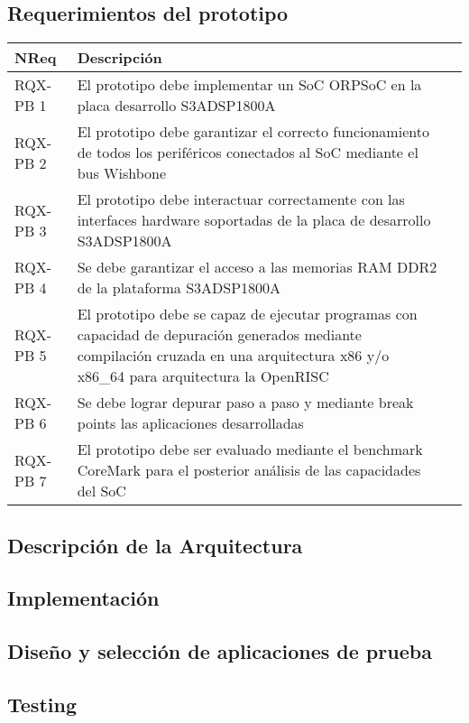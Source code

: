 		\subsection{Requerimientos del prototipo}
		\begin{tabular}{ p{2.5cm} p{8cm} p{3cm} }
		\hline 
		\rowcolor[gray]{0.8} N\textordmasculine Req & Descripción\\
		\hline 
		RQX-PB 1 & El prototipo debe implementar un SoC ORPSoC en la placa desarrollo S3ADSP1800A\\ 
		\hline 
		RQX-PB 2 & El prototipo debe garantizar el correcto funcionamiento de todos los periféricos conectados al SoC mediante el bus Wishbone\\ 
		\hline 
		RQX-PB 3 & El prototipo debe interactuar correctamente con las interfaces hardware soportadas de la placa de desarrollo S3ADSP1800A\\ 
		\hline
		RQX-PB 4 & Se debe garantizar el acceso a las memorias RAM DDR2 de la plataforma S3ADSP1800A\\
		\hline
		RQX-PB 5 & El prototipo debe se capaz de ejecutar programas con capacidad de depuración generados mediante compilación
		cruzada en una arquitectura x86 y/o x86\_64 para arquitectura la OpenRISC\\
		\hline
		RQX-PB 6 & Se debe lograr depurar paso a paso y mediante break points las aplicaciones desarrolladas\\
		\hline
		RQX-PB 7 & El prototipo debe ser evaluado mediante el benchmark CoreMark para el posterior análisis de las capacidades del SoC\\
		\hline		
		\end{tabular}

		\subsection{Descripción de la Arquitectura}

	
		\subsection{Implementación}

		
		\subsection{Diseño y selección de aplicaciones de prueba}
		
		
		\subsection{Testing}


